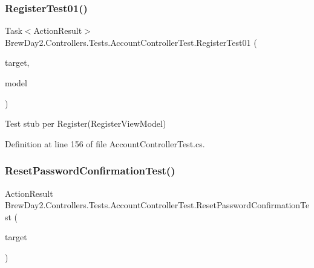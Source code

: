 \subsubsection{\texorpdfstring{Register\+Test01()}{RegisterTest01()}}
{\footnotesize\ttfamily Task$<$Action\+Result$>$ Brew\+Day2.\+Controllers.\+Tests.\+Account\+Controller\+Test.\+Register\+Test01 (\begin{DoxyParamCaption}\item[{\mbox{[}\+Pex\+Assume\+Under\+Test\mbox{]} \mbox{\hyperlink{class_brew_day2_1_1_controllers_1_1_account_controller}{Account\+Controller}}}]{target,  }\item[{\mbox{\hyperlink{class_brew_day2_1_1_models_1_1_register_view_model}{Register\+View\+Model}}}]{model }\end{DoxyParamCaption})}



Test stub per Register(\+Register\+View\+Model)



Definition at line 156 of file Account\+Controller\+Test.\+cs.

\mbox{\label{class_brew_day2_1_1_controllers_1_1_tests_1_1_account_controller_test_a3b0477d8fb3494f77f461458bf761e30}} 
\subsubsection{\texorpdfstring{Reset\+Password\+Confirmation\+Test()}{ResetPasswordConfirmationTest()}}
{\footnotesize\ttfamily Action\+Result Brew\+Day2.\+Controllers.\+Tests.\+Account\+Controller\+Test.\+Reset\+Password\+Confirmation\+Test (\begin{DoxyParamCaption}\item[{\mbox{[}\+Pex\+Assume\+Under\+Test\mbox{]} \mbox{\hyperlink{class_brew_day2_1_1_controllers_1_1_account_controller}{Account\+Controller}}}]{target }\end{DoxyParamCaption})}



